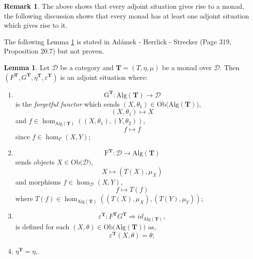 \documentclass[11pt,a4paper]{article}
\theoremstyle{definition}
\newtheorem{lemma}[thm]{Lemma}
\newtheorem{remark}[thm]{Remark}
\newcommand\ho[3][]{\hom_{#1}(#2,#3)}
\newcommand\ob[1]{\mathrm{Ob(}#1\mathrm{)}}
\newcommand\cat[1]{\mathscr{#1}}
\newcommand\func[3]{\mathrm{#1}\colon#2\rightarrow#3}
\newcommand\nattran[3]{#1\colon#2\Rightarrow#3}
\newcommand{\alg}[1]{\mathrm{Alg}(\mathbf{#1})}
\numberwithin{equation}{section}
\begin{document}
\begin{remark}
    The above shows that every adjoint situation gives rise to a monad, the following discussion shows that every monad has at least one adjoint situation which gives rise to it. 
\end{remark}
The following Lemma \ref{lem:mongivesadjsitu} is stated in Adámek - Herrlick - Strecker \cite{ACC} (Page 319, Proposition 20.7) but not proven.
\begin{lemma}
\label{lem:mongivesadjsitu}
    Let $\cat{D}$ be a category and $\mathbf{T}= (T,\eta,\mu)$ be a monad over $\cat{D}$. Then $(F^{\mathbf{T}},G^{\mathbf{T}},\eta^{\mathbf{T}},\varepsilon^{\mathbf{T}})$ is an adjoint situation where:
    \begin{enumerate}
        \item 
    \[\func{G^{\mathbf{T}}}{\alg{T}}{\cat{D}}\] is the \emph{forgetful functor} which sends $(X,\theta_1)\in\ob{\alg{T}},$
    \[(X,\theta_1)\mapsto X\]
    and $f\in\ho[\alg{T}]{(X,\theta_1)}{(Y,\theta_2)}$,
    \[f\mapsto f\]
    since $f\in\ho[\cat{C}]{X}{Y}$;
    \item
    \[\func{F^{\mathbf{T}}}{\cat{D}}{\alg{T}}\]
    sends objects $X\in\ob{\cat{D}}$,
    \[X\mapsto (T(X),\mu_X)\]
    and morphisms $f\in\ho[\cat{D}]{X}{Y}$,
    \[f\mapsto T(f)\]
    where $T(f)\in\ho[\alg{T}]{(T(X),\mu_X)}{(T(Y),\mu_Y)}$;
    \item \[\nattran{\varepsilon^{\mathbf{T}}}{F^{\mathbf{T}}G^{\mathbf{T}}}{id_{\alg{T}}},\]
    is defined for each $(X,\theta)\in\ob{\alg{T}}$ as,
    \[\varepsilon^{\mathbf{T}}{(X,\theta)} = \theta;\]
    \item $\eta^{\mathbf{T}}=\eta$,.
        \end{enumerate}
\end{lemma}
\end{document}
